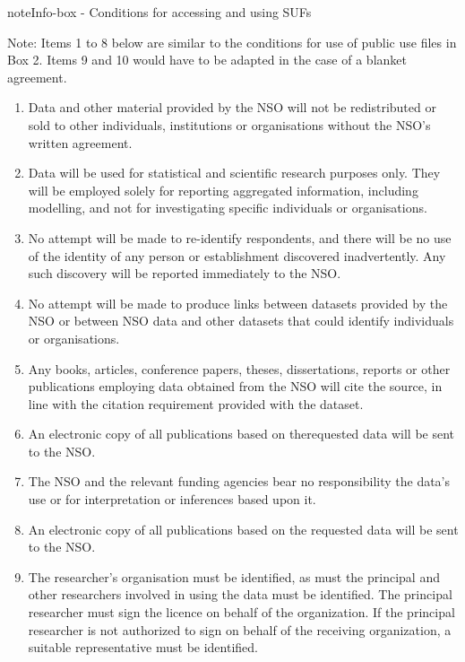 \documentclass[letterpaper,10pt,english]{sphinxmanual}
\begin{document}
\begin{sphinxadmonition}{note}{Info-box - Conditions for accessing and using SUFs}

Note: Items 1 to 8 below are similar to the conditions for use of public use files in Box 2. Items 9 and 10 would have to be adapted in the case of a blanket agreement.
\begin{enumerate}
\item {} 
Data and other material provided by the NSO will not be redistributed or sold to other individuals, institutions or organisations without the NSO’s written agreement.

\item {} 
Data will be used for statistical and scientific research purposes only. They will be employed solely for reporting aggregated information, including modelling, and not for investigating specific individuals or organisations.

\item {} 
No attempt will be made to re-identify respondents, and there will be no use of the identity of any person or establishment discovered inadvertently. Any such discovery will be reported immediately to the NSO.

\item {} 
No attempt will be made to produce links between datasets provided by the NSO or between NSO data and other datasets that could identify individuals or organisations.

\item {} 
Any books, articles, conference papers, theses, dissertations, reports or other publications employing data obtained from the NSO will cite the source, in line with the citation requirement provided with the dataset.

\item {} 
An electronic copy of all publications based on therequested data will be sent to the NSO.

\item {} 
The NSO and the relevant funding agencies bear no responsibility the data’s use or for interpretation or inferences based upon it.

\item {} 
An electronic copy of all publications based on the requested data will be sent to the NSO.

\item {} 
The researcher’s organisation must be identified, as must the principal and other researchers involved in using the data must be identified. The principal researcher must sign the licence on behalf of the organization. If the principal researcher is not authorized to sign on behalf of the receiving organization, a suitable representative must be identified.


\end{enumerate}
\end{sphinxadmonition}
\end{document}
